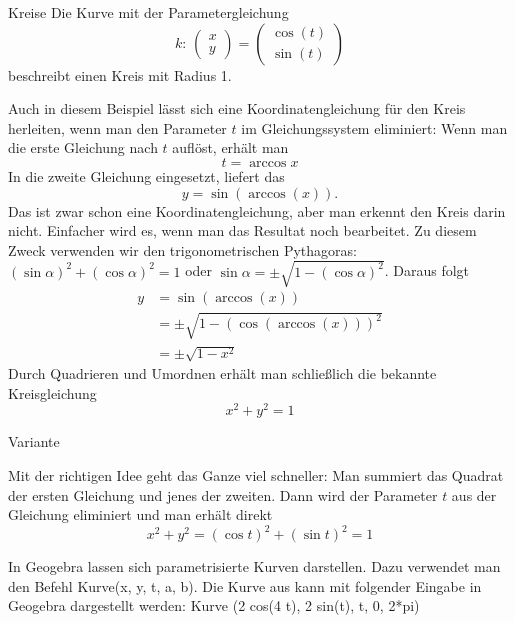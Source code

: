 \begin{bsp}{Kreise}{}
    Die Kurve  mit der Parametergleichung
    \[ k: \, \begin{pmatrix}
            x \\ y
        \end{pmatrix} =
        \begin{pmatrix}
            \cos\left(t\right) \\
            \sin\left(t\right)
        \end{pmatrix}
    \]
    beschreibt einen Kreis mit Radius 1.

    Auch in diesem Beispiel lässt sich eine Koordinatengleichung für den Kreis herleiten, wenn man den Parameter \(t\) im Gleichungssystem eliminiert:
    Wenn man die erste Gleichung nach \( t \) auflöst, erhält man
    \[
        t = \arccos x
    \]
    In die zweite Gleichung eingesetzt, liefert das
    \[
        y = \sin(\arccos(x)).
    \]
    Das ist zwar schon eine Koordinatengleichung, aber man erkennt den Kreis darin nicht. Einfacher wird es, wenn man das Resultat noch bearbeitet. Zu diesem Zweck verwenden wir den trigonometrischen Pythagoras: \( (\sin \alpha)^2 + (\cos \alpha)^2 = 1 \) oder \( \sin \alpha = \pm \sqrt{1 - (\cos \alpha)^2} \). Daraus folgt
    \[
        \begin{aligned}
            y & = \sin(\arccos(x))                    \\
              & = \pm \sqrt{1 - (\cos(\arccos(x)))^2} \\
              & = \pm \sqrt{1 - x^2}
        \end{aligned}
    \]
    Durch Quadrieren und Umordnen erhält man schließlich die bekannte Kreisgleichung
    \[
        x^2 + y^2 = 1
    \]

    Variante

    Mit der richtigen Idee geht das Ganze viel schneller: Man summiert das Quadrat der ersten Gleichung und jenes der zweiten. Dann wird der Parameter \( t \) aus der Gleichung eliminiert und man erhält direkt
    \[
        x^2 + y^2 = (\cos t)^2 + (\sin t)^2 = 1
    \]

\end{bsp}

In Geogebra lassen sich parametrisierte Kurven darstellen. Dazu verwendet man den Befehl Kurve(x, y, t, a, b). Die Kurve aus  kann mit folgender Eingabe in Geogebra dargestellt werden: Kurve (2 cos(4 t), 2 sin(t), t, 0, 2*pi)

